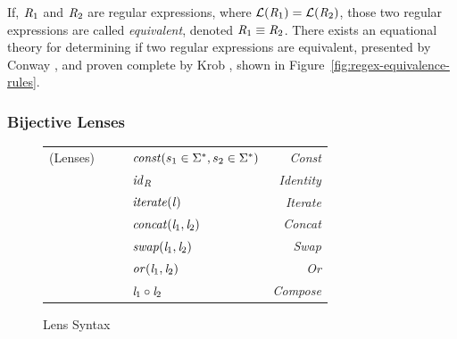 \documentclass[numbers]{sigplanconf}
\begin{document}
If, $\mathit{R}_1$ and $\mathit{R}_2$ are regular expressions, where
$\mathcal{L}(\mathit{R}_1)=\mathcal{L}(\mathit{R}_2)$, those two regular expressions
are called \textit{equivalent}, denoted $\mathit{R}_1\equiv\mathit{R}_2$.
There exists an equational theory for determining if two regular expressions are equivalent,
presented by Conway \cite{conway}, and proven complete by Krob \cite{Krob},
shown in Figure~\ref{fig:regex-equivalence-rules}.

\subsubsection{Bijective Lenses}

\begin{figure}
\centering
\begin{tabular}{l@{\ }l@{\ }c@{\ }l@{\ }>{\itshape\/}r}
(Lenses)& \Lens{} & \GEq{} & $\mathit{const}(s_1 \in {\ensuremath{\Sigma}}^*,s_2 \in {\ensuremath{\Sigma}}^*)$ & Const \\
& & & \GBar{} $\mathit{id}_{\mathit{R}}$ & Identity\\
& & & \GBar{} $\mathit{iterate(\mathit{l})}$ & Iterate \\
& & & \GBar{} $\mathit{concat}(\mathit{l}_1,\mathit{l}_2)$ & Concat \\
& & & \GBar{} $\mathit{swap}(\mathit{l}_1,\mathit{l}_2)$ & Swap\\
& & & \GBar{} $\mathit{or}(\mathit{l}_1,\mathit{l}_2)$ & Or\\
& & & \GBar{} $\mathit{l}_1 \circ \mathit{l}_2$ & Compose\\
\end{tabular}
\caption{Lens Syntax}
\label{fig:lens-syntax}
\end{figure}
\end{document}
